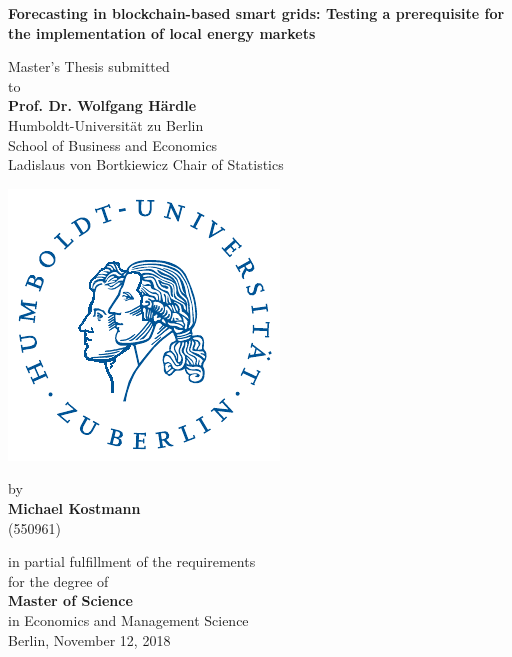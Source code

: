 \begin{center}
\vspace*{0.5cm}

    {\Large{\bf Forecasting in blockchain-based smart grids: Testing a prerequisite for the implementation of local energy markets}} \vspace{1cm}


    {\normalsize Master's Thesis submitted\\\vspace{0.5cm}
    to}\\\vspace{0.5cm}
    {\normalsize{\bf Prof. Dr. Wolfgang H\"ardle}} \\\vspace{0.5cm}
    {\normalsize Humboldt-Universit\"at zu Berlin \\
    School of Business and Economics \\
    Ladislaus von Bortkiewicz Chair of Statistics} \vspace{1cm}
    
    \includegraphics[]{thesis/figures/logo.pdf}
    \vspace{1cm}

    {\normalsize by \\\vspace{0.5cm}
    {\bf Michael Kostmann} \\
    (550961)} \vspace{1cm}


    {\normalsize in partial fulfillment of the requirements \\
    for the degree of \\
    {\bf Master of Science} \\
    in Economics and Management Science \\\vspace{1cm}
    Berlin, November 12,  2018}

\end{center}
